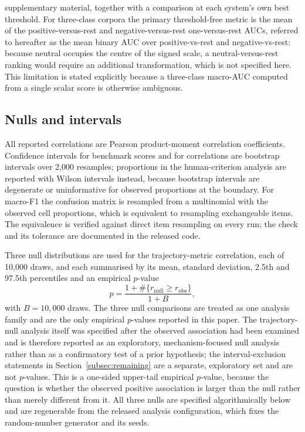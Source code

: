 \documentclass[fleqn,10pt]{wlscirep}
\begin{document}
supplementary material, together with a comparison at each system's own best threshold. For three-class corpora the primary threshold-free metric is the mean of the positive-versus-rest and negative-versus-rest one-versus-rest AUCs, referred to hereafter as the mean binary AUC over positive-vs-rest and negative-vs-rest: because neutral occupies the centre of the signed scale, a neutral-versus-rest ranking would require an additional transformation, which is not specified here. This limitation is stated explicitly because a three-class macro-AUC computed from a single scalar score is otherwise ambiguous.

\subsection{Nulls and intervals}\label{subsec:nullmethod}

All reported correlations are Pearson product-moment correlation coefficients. Confidence intervals for benchmark scores and for correlations are bootstrap intervals\cite{efron1993} over 2{,}000 resamples; proportions in the human-criterion analysis are reported with Wilson intervals\cite{wilson1927} instead, because bootstrap intervals are degenerate or uninformative for observed proportions at the boundary. For macro-F1 the confusion matrix is resampled from a multinomial with the observed cell proportions, which is equivalent to resampling exchangeable items. The equivalence is verified against direct item resampling on every run; the check and its tolerance are documented in the released code.

Three null distributions are used for the trajectory-metric correlation, each of 10{,}000 draws, and each summarised by its mean, standard deviation, 2.5th and 97.5th percentiles and an empirical $p$-value
\begin{equation}
p = \frac{1 + \#\{r_{\mathrm{null}} \ge r_{\mathrm{obs}}\}}{1 + B},
\label{eq:pval}
\end{equation}
with $B=10{,}000$ draws. The three null comparisons are treated as one analysis family and are the only empirical $p$-values reported in this paper. The trajectory-null analysis itself was specified after the observed association had been examined and is therefore reported as an exploratory, mechanism-focused null analysis rather than as a confirmatory test of a prior hypothesis; the interval-exclusion statements in Section~\ref{subsec:remaining} are a separate, exploratory set and are not $p$-values. This is a one-sided upper-tail empirical $p$-value, because the question is whether the observed positive association is larger than the null rather than merely different from it. All three nulls are specified algorithmically below and are regenerable from the released analysis configuration, which fixes the random-number generator and its seeds.
\end{document}
